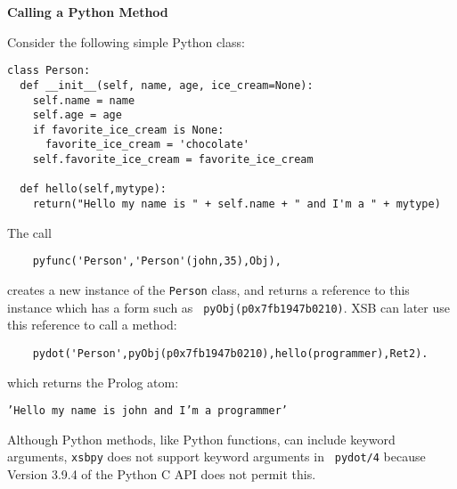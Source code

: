 \begin{example} \rm {\bf Calling a Python Method} \label{xsbpy-examp:method}

\noindent
Consider the following simple Python class:

\begin{verbatim}
class Person:
  def __init__(self, name, age, ice_cream=None):
    self.name = name
    self.age = age
    if favorite_ice_cream is None:
      favorite_ice_cream = 'chocolate'
    self.favorite_ice_cream = favorite_ice_cream

  def hello(self,mytype):
    return("Hello my name is " + self.name + " and I'm a " + mytype)
\end{verbatim}

\noindent
The call

\begin{verbatim}
    pyfunc('Person','Person'(john,35),Obj),
\end{verbatim}
\noindent
creates a new instance of the {\tt Person} class, and returns a
reference to this instance which has a form such as {\tt
  pyObj(p0x7fb1947b0210)}.  XSB can later use this reference to call a
method:
\begin{verbatim}
    pydot('Person',pyObj(p0x7fb1947b0210),hello(programmer),Ret2).
\end{verbatim}

\noindent
which returns the Prolog atom:

{\tt 'Hello my name is john and I'm a programmer'}

\noindent
Although Python methods, like Python functions, can include keyword
arguments, {\tt xsbpy} does not support keyword arguments in {\tt
  pydot/4} because Version 3.9.4 of the Python C API does not permit
this.
\end{example}

